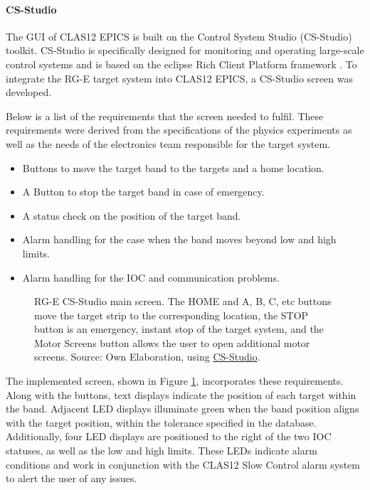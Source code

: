 \paragraph{CS-Studio}
    The GUI of CLAS12 EPICS is built on the Control System Studio (CS-Studio) toolkit.
    CS-Studio is specifically designed for monitoring and operating large-scale control systems and is based on the eclipse Rich Client Platform framework \cite{kasemir2007}.
    To integrate the RG-E target system into CLAS12 EPICS, a CS-Studio screen was developed.

    Below is a list of the requirements that the screen needed to fulfil.
    These requirements were derived from the specifications of the physics experiments as well as the needs of the electronics team responsible for the target system.

    \begin{itemize}
        \item
            Buttons to move the target band to the targets and a home location.
        \item
            A Button to stop the target band in case of emergency.
        \item
            A status check on the position of the target band.
        \item
            Alarm handling for the case when the band moves beyond low and high limits.
        \item
            Alarm handling for the IOC and communication problems.
    \end{itemize}

    \begin{figure}[b!]
        \centering{}
        \caption[RG-E CS-Studio main screen]{RG-E CS-Studio main screen. The HOME and A, B, C, etc buttons move the target strip to the corresponding location, the STOP button is an emergency, instant stop of the target system, and the Motor Screens button allows the user to open additional motor screens.
        Source: Own Elaboration, using \href{https://controlsystemstudio.org/}{CS-Studio}.}
        \label{fig::11.312::rge_motorx}
    \end{figure}

    The implemented screen, shown in Figure \ref{fig::11.312::rge_motorx}, incorporates these requirements.
    Along with the buttons, text displays indicate the position of each target within the band.
    Adjacent LED displays illuminate green when the band position aligns with the target position, within the tolerance specified in the database.
    Additionally, four LED displays are positioned to the right of the two IOC statuses, as well as the low and high limits.
    These LEDs indicate alarm conditions and work in conjunction with the CLAS12 Slow Control alarm system to alert the user of any issues.

